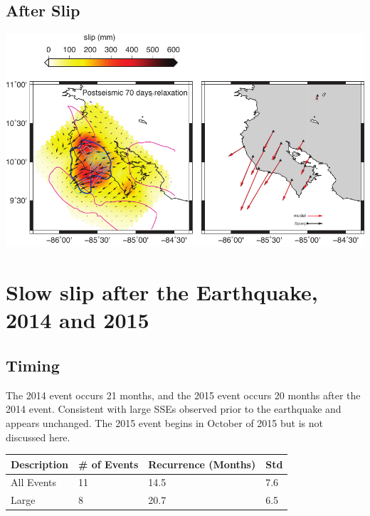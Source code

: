 \documentclass[a0,landscape]{a0poster}
\begin{document}
\begin{multicols}{5}
\subsection*{After Slip}
\begin{center}\vspace{0.5cm}
	\includegraphics[width=18cm]{afterslip_70.pdf}
\end{center}\vspace{0.5cm}
\color{SaddleBrown}
\section*{Slow slip after the Earthquake, 2014 and 2015}
\color{DarkSlateGray}
\subsection*{Timing}

The 2014 event occurs 21 months, and the 2015 event occurs 20 months after the 2014 event. Consistent with large SSEs observed prior to the earthquake and appears unchanged. The 2015 event begins in October of 2015 but is not discussed here. 
\large
\vspace{0.5cm}
\begin{center}
	\begin{tabular}{l l l l}
		\toprule
		\textbf{Description} & \textbf{\# of Events} & \textbf{Recurrence (Months)} & \textbf{Std}\\
		\midrule
		All Events & 11 & 14.5 & 7.6\\
		Large & 8 & 20.7 & 6.5\\
		\bottomrule
	\end{tabular}
\end{center}
\vspace{0.2cm}

\end{multicols}
\end{document}
